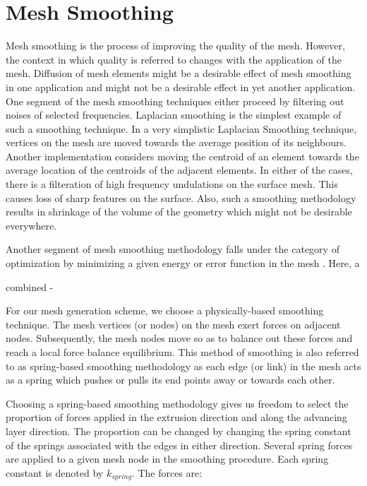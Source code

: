 \section{Mesh Smoothing}

Mesh smoothing is the process of improving the quality of the mesh. However, the context in which quality is referred to changes with the application of the mesh. Diffusion of mesh elements might be a desirable effect of mesh smoothing in one application and might not be a desirable effect in yet another application. One segment of the mesh smoothing techniques either proceed by filtering out noises of selected frequencies. Laplacian smoothing is the simplest example of such a smoothing technique. In a very simplistic Laplacian Smoothing technique, vertices on the mesh are moved towards the average position of its neighbours. Another implementation considers moving the centroid of an element towards the average location of the centroids of the adjacent elements. In either of the cases, there is a filteration of high frequency undulations on the surface mesh. This causes loss of sharp features on the surface. Also, such a smoothing methodology results in shrinkage of the volume of the geometry which might not be desirable everywhere.

Another segment of mesh smoothing methodology falls under the category of optimization by minimizing a given energy or error function in the mesh \cite{freitag1997tetrahedral, zhou2000angle, chen2004mesh, parthasarathy1991constrained, shephard1991automatic}. Here, a 

combined - \cite{freitag1997combining, canann1998approach}

For our mesh generation scheme, we choose a physically-based smoothing technique. The mesh vertices (or nodes) on the mesh exert forces on adjacent nodes. Subsequently, the mesh nodes move so as to balance out these forces and reach a local force balance equilibrium. This method of smoothing is also referred to as spring-based smoothing methodology as each edge (or link) in the mesh acts as a spring which pushes or pulls its end points away or towards each other.

Choosing a spring-based smoothing methodology gives us freedom to select the proportion of forces applied in the extrusion direction and along the advancing layer direction. The proportion can be changed by changing the spring constant of the springs associated with the edges in either direction. Several spring forces are applied to a given mesh node in the smoothing procedure. Each spring constant is denoted by $k_{spring}$. The forces are:


